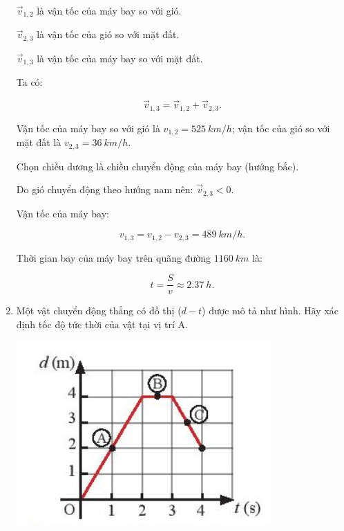 \begin{enumerate}[label=\bfseries Câu \arabic*:]
{		$\vec v_{1,2}$ là vận tốc của máy bay so với gió.
		
		
		$\vec v_{2,3}$ là vận tốc của gió so với mặt đất.
		
		
		$\vec v_{1,3}$ là vận tốc của máy bay so với mặt đất.
		
		Ta có:
		
		$$\vec v_{1,3} = \vec v_{1,2} + \vec v_{2,3}.$$
		
		Vận tốc của máy bay so với gió là $v_{1,2}= \SI{525}{km/h}$; vận tốc của gió so với mặt đất là $ v_{2,3}= \SI{36}{km/h}$.
		
		Chọn chiều dương là chiều chuyển động của máy bay (hướng bắc).
		
		Do gió chuyển động theo hướng nam nên: $\vec v_{2,3} <0$.
		
		Vận tốc của máy bay:
		
		$$v_{1,3} = v_{1,2} - v_{2,3} = \SI{489}{km/h}.$$
		
		Thời gian bay của máy bay trên quãng đường $\SI{1160}{km}$ là:
		
		$$ t =\dfrac{S}{v} \approx \SI{2,37}{h}.$$
	}
		\item {}
	
	
	{Một vật chuyển động thẳng có đồ thị ($d - t$) được mô tả như hình. Hãy xác định tốc độ tức thời của vật tại vị trí A.
		
		\begin{center}
			\includegraphics[scale=0.6]{../figs/VN10-2022-PH-TP0001-4.jpg}
		\end{center}	
	}
	

\end{enumerate}
